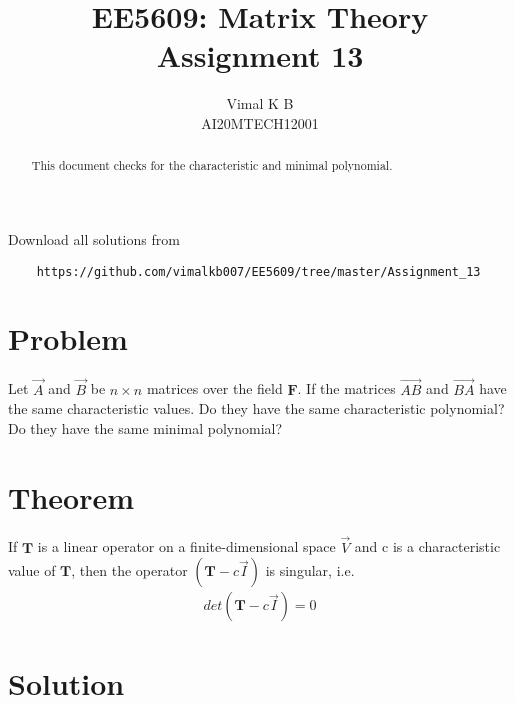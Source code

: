 \documentclass[journal,12pt,twocolumn]{IEEEtran}
\begin{document}
	\def\putbox#1#2#3{\makebox[0in][l]{\makebox[#1][l]{}\raisebox{\baselineskip}[0in][0in]{\raisebox{#2}[0in][0in]{#3}}}}
	\def\rightbox#1{\makebox[0in][r]{#1}}
	\def\centbox#1{\makebox[0in]{#1}}
	\def\topbox#1{\raisebox{-\baselineskip}[0in][0in]{#1}}
	\def\midbox#1{\raisebox{-0.5\baselineskip}[0in][0in]{#1}}
	\vspace{3cm}
	\title{EE5609: Matrix Theory\\
		Assignment 13\\}
	\author{Vimal K B\\
		AI20MTECH12001}
	\maketitle
	\newpage
	\bigskip
	\renewcommand{\thefigure}{\theenumi}
	\renewcommand{\thetable}{\theenumi}
	\begin{abstract}
		This document checks for the characteristic and minimal polynomial.
	\end{abstract}
	Download all solutions from 
	\begin{lstlisting}
	https://github.com/vimalkb007/EE5609/tree/master/Assignment_13
	\end{lstlisting}
	\section{Problem}
	Let $\vec{A}$ and $\vec{B}$ be $n\times n$ matrices over the field $\mathbf{F}$. If the matrices $\vec{AB}$ and $\vec{BA}$ have the same characteristic values. Do they have the same characteristic polynomial? Do they have the same minimal polynomial? 
 	
	
	\section{Theorem}
	
	\begin{theorem}\label{thm1}
	    If $\mathbf{T}$ is a linear operator on a finite-dimensional space $\vec{V}$ and c is a characteristic value of $\mathbf{T}$, then the operator $(\mathbf{T} - c\vec{I})$ is singular, i.e.
	    \begin{align}
	    	det\left(\mathbf{T}-c\vec{I}\right) = 0 \nonumber
	    \end{align} 
	\end{theorem}
	    
	\section{Solution}
	
\end{document}
